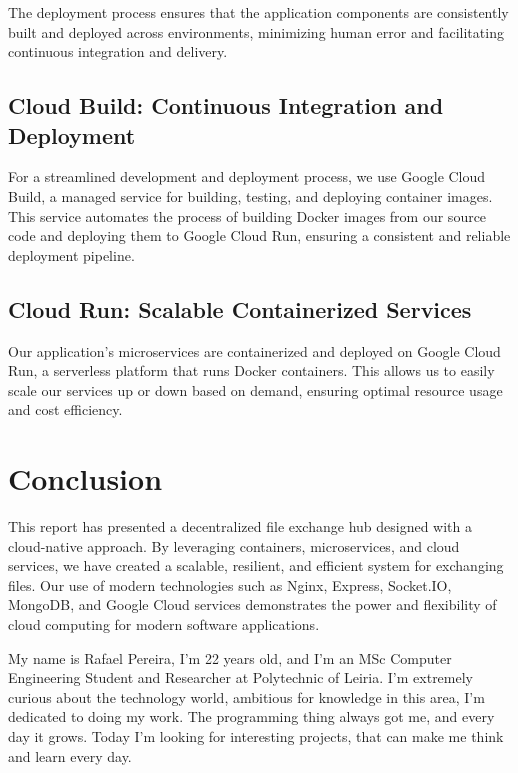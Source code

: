 \documentclass[a4paper,fleqn]{cas-dc}
\begin{document}
The deployment process ensures that the application components are consistently built and deployed across environments, minimizing human error and facilitating continuous integration and delivery.


\subsection{Cloud Build: Continuous Integration and Deployment}

For a streamlined development and deployment process, we use Google Cloud Build, a managed service for building, testing, and deploying container images. This service automates the process of building Docker images from our source code and deploying them to Google Cloud Run, ensuring a consistent and reliable deployment pipeline.

\subsection{Cloud Run: Scalable Containerized Services}

Our application's microservices are containerized and deployed on Google Cloud Run, a serverless platform that runs Docker containers. This allows us to easily scale our services up or down based on demand, ensuring optimal resource usage and cost efficiency.

\section{Conclusion}

This report has presented a decentralized file exchange hub designed with a cloud-native approach. By leveraging containers, microservices, and cloud services, we have created a scalable, resilient, and efficient system for exchanging files. Our use of modern technologies such as Nginx, Express, Socket.IO, MongoDB, and Google Cloud services demonstrates the power and flexibility of cloud computing for modern software applications.

%
%
%



My name is Rafael Pereira, I'm 22 years old, and I'm an MSc Computer Engineering Student and Researcher at Polytechnic of Leiria. I'm extremely curious about the technology world, ambitious for knowledge in this area, I'm dedicated to doing my work. The programming thing always got me, and every day it grows. Today I'm looking for interesting projects, that can make me think and learn every day.
\endbio
\end{document}
